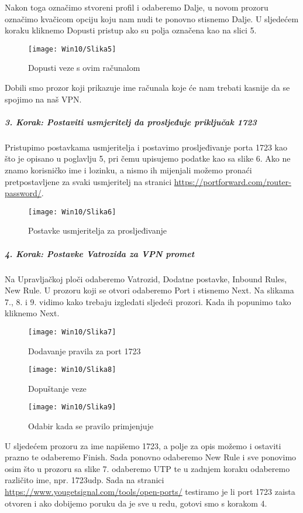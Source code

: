 \FloatBarrier
Nakon toga označimo stvoreni profil i odaberemo Dalje, u novom prozoru označimo kvačicom opciju koju nam nudi te ponovno stisnemo Dalje. U sljedećem koraku kliknemo Dopusti pristup ako su polja označena kao na slici 5.
\FloatBarrier
\begin{figure}[h!]
	\centering
     \texttt{[image: Win10/Slika5]}
     \caption{Dopusti veze s ovim računalom}
\end{figure}
\FloatBarrier
Dobili smo prozor koji prikazuje ime računala koje će nam trebati kasnije da se spojimo na naš VPN.
\FloatBarrier
\newpage
\subparagraph{3. Korak: Postaviti usmjeritelj da prosljeđuje priključak 1723}
\hfill \smallbreak
Pristupimo postavkama usmjeritelja i postavimo prosljeđivanje porta 1723 kao što je opisano u poglavlju 5, pri čemu upisujemo podatke kao sa slike 6. Ako ne znamo korisničko ime i lozinku, a nismo ih mijenjali možemo pronaći pretpostavljene za svaki usmjeritelj na stranici \url{https://portforward.com/router-password/}. 
\FloatBarrier
\begin{figure}[h!]
	\centering
     \texttt{[image: Win10/Slika6]}
     \caption{Postavke usmjeritelja za prosljeđivanje}
\end{figure}
\FloatBarrier
\subparagraph{4. Korak: Postavke Vatrozida za VPN promet}
\hfill \smallbreak
Na Upravljačkoj ploči odaberemo Vatrozid, Dodatne postavke, Inbound Rules, New Rule. U prozoru koji se otvori odaberemo Port i stisnemo Next. Na slikama 7., 8. i 9. vidimo kako trebaju izgledati sljedeći prozori. Kada ih popunimo tako kliknemo Next.
\FloatBarrier
\begin{figure}[h!]
	\centering
     \texttt{[image: Win10/Slika7]}
     \caption{Dodavanje pravila za port 1723}
\end{figure}
\FloatBarrier
\FloatBarrier
\begin{figure}[h!]
	\centering
     \texttt{[image: Win10/Slika8]}
     \caption{Dopuštanje veze}
\end{figure}
\FloatBarrier
\FloatBarrier
\begin{figure}[h!]
	\centering
     \texttt{[image: Win10/Slika9]}
     \caption{Odabir kada se pravilo primjenjuje}
\end{figure}
\FloatBarrier
U sljedećem prozoru za ime napišemo 1723, a polje za opis možemo i ostaviti prazno te odaberemo Finish. Sada ponovno odaberemo New Rule i sve ponovimo osim što u prozoru sa slike 7. odaberemo UTP te u zadnjem koraku odaberemo različito ime, npr. 1723udp. Sada na stranici \url{https://www.yougetsignal.com/tools/open-ports/} testiramo je li port 1723 zaista otvoren i ako dobijemo poruku da je sve u redu, gotovi smo s korakom 4.
